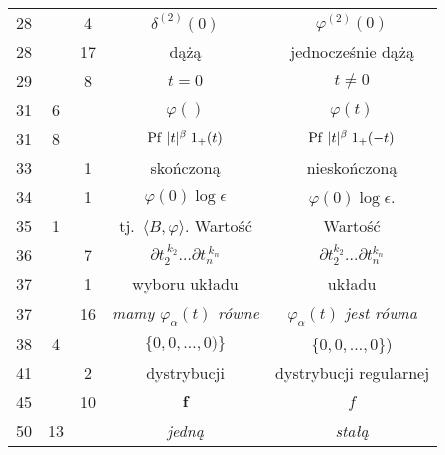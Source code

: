\documentclass[a4paper,11pt]{article}
\numberwithin{equation}{section}
\begin{document}
\begin{center}
\begin{tabular}{|c|c|c|c|c|}
    28  & & \hphantom{0}4 & $\delta^{ ( 2 ) }( 0 )$ & $\varphi^{ ( 2 ) }( 0 )$ \\
    28  & & 17 & dążą & jednocześnie dążą \\
    29  & & \hphantom{0}8 & $t = 0$ & $t \neq 0$ \\
    31  & \hphantom{0}6 & & $\varphi( )$ & $\varphi( t )$ \\
    31  & \hphantom{0}8 & & $\operatorname{Pf} \, | t |^{ \beta } \; 1_{ + }( t )$
           & $\operatorname{Pf} \, | t |^{ \beta } \; 1_{ + }( -t )$ \\
    33  & & \hphantom{0}1 & skończoną & nieskończoną \\
    34  & & \hphantom{0}1 & $\varphi( 0 ) \log \epsilon$ & $\varphi( 0 ) \log \epsilon$. \\
    35 & \hphantom{0}1 & & tj.~$\langle B, \varphi \rangle$. Wartość & Wartość \\
    36 & & \hphantom{0}7 & $\partial t_{ 2 }^{ \: k_{ 2 } } \ldots \partial t_{ n }^{ \: k_{ n } }$
           & $\partial t_{ 2 }^{ k_{ 2 } } \ldots \partial t_{ n }^{ k_{ n } }$ \\
    37 & & \hphantom{0}1 & wyboru układu & układu \\
    37 & & 16 & \textit{mamy $\varphi_{ \alpha }( t )$ równe}
           & \textit{$\varphi_{ \alpha }( t )$ jest równa} \\
    38  & \hphantom{0}4 & & $\{ 0, 0, \ldots, 0 ) \}$ & $\{ 0, 0, \ldots, 0 \}$) \\
    41  & & \hphantom{0}2 & dystrybucji & dystrybucji regularnej \\
    45  & & 10 & $\boldsymbol{f}$ & $f$ \\
    50  & 13 & & \textit{jedną} & \textit{stałą} \\
    \hline
  \end{tabular}




\end{center}
\end{document}
